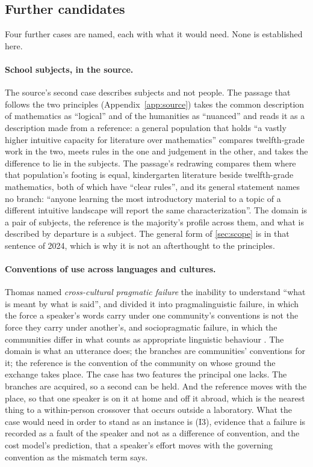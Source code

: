 \subsection{Further candidates}
\label{sec:candidates}

Four further cases are named, each with what it would need. None is established here.

\paragraph{School subjects, in the source.} The source's second case describes subjects and not people. The passage that follows the two principles (Appendix~\ref{app:source}) takes the common description of mathematics as ``logical'' and of the humanities as ``nuanced'' and reads it as a description made from a reference: a general population that holds ``a vastly higher intuitive capacity for literature over mathematics'' compares twelfth-grade work in the two, meets rules in the one and judgement in the other, and takes the difference to lie in the subjects. The passage's redrawing compares them where that population's footing is equal, kindergarten literature beside twelfth-grade mathematics, both of which have ``clear rules'', and its general statement names no branch: ``anyone learning the most introductory material to a topic of a different intuitive landscape will report the same characterization''. The domain is a pair of subjects, the reference is the majority's profile across them, and what is described by departure is a subject. The general form of \autoref{sec:scope} is in that sentence of 2024, which is why it is not an afterthought to the principles.

\paragraph{Conventions of use across languages and cultures.} Thomas named \emph{cross-cultural pragmatic failure} the inability to understand ``what is meant by what is said'', and divided it into pragmalinguistic failure, in which the force a speaker's words carry under one community's conventions is not the force they carry under another's, and sociopragmatic failure, in which the communities differ in what counts as appropriate linguistic behaviour \cite{Thomas1983}. The domain is what an utterance does; the branches are communities' conventions for it; the reference is the convention of the community on whose ground the exchange takes place. The case has two features the principal one lacks. The branches are acquired, so a second can be held. And the reference moves with the place, so that one speaker is on it at home and off it abroad, which is the nearest thing to a within-person crossover that occurs outside a laboratory. What the case would need in order to stand as an instance is (I3), evidence that a failure is recorded as a fault of the speaker and not as a difference of convention, and the cost model's prediction, that a speaker's effort moves with the governing convention as the mismatch term says.

